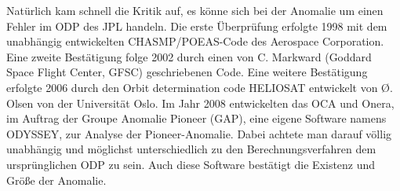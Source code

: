 Natürlich kam schnell die Kritik auf, es könne sich bei der Anomalie um einen Fehler im ODP des JPL handeln.
Die erste Überprüfung erfolgte 1998 mit dem unabhängig entwickelten CHASMP/POEAS-Code des Aerospace
Corporation.
Eine zweite Bestätigung folge 2002 durch einen von C. Markward (Goddard Space Flight Center, GFSC) geschriebenen
Code.
Eine weitere Bestätigung erfolgte 2006 durch den Orbit determination code HELIOSAT entwickelt von Ø. Olsen von der
Universität Oslo.
Im Jahr 2008 entwickelten das OCA und Onera, im Auftrag der Groupe Anomalie Pioneer (GAP), eine eigene Software namens ODYSSEY,
zur Analyse der Pioneer-Anomalie.
Dabei achtete man darauf völlig unabhängig und möglichst unterschiedlich zu den Berechnungsverfahren dem ursprünglichen ODP zu sein. 
Auch diese Software bestätigt die Existenz und Größe der Anomalie.\cite{Levy2008}


